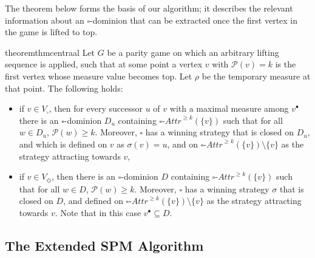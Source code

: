 \documentclass{eptcs}
\newcommand{\odd}{\ensuremath{\square}\xspace}
\newcommand{\even}{\ensuremath{\Diamond}\xspace}
\newcommand{\post}[1]{\ensuremath{#1^{\bullet}}}
\newcommand{\attrsym}{\ensuremath{\textit{Attr}}}
\newcommand{\myattr}[3]{\ensuremath{{#2}{\text{-}}\attrsym^{#1}(#3)}}
\newcommand{\priosym}{\mathcal{P}}
\newcommand{\prio}[1]{\priosym(#1)}
\begin{document}
\newcommand{\exttuples}[1]{\mathbb{M}^{#1,\textsf{ext}}}
\def\extprog{newProg}

 
\noindent
The theorem below forms the basis of our algorithm; it describes
the relevant information about an \odd-dominion that can be extracted
once the first vertex in the game is lifted to top.

\begin{restatable}{theorem}{thmcentraal}
 \label{thm:centraal}
  Let $G$ be a parity game on which an arbitrary lifting sequence is applied, such that at some point a vertex $v$ with $\prio{v}=k$ is the first vertex whose measure value becomes top. Let $\rho$ be the temporary measure at that point. The following holds:
  
  \begin{itemize}
   \item if $v \in V_{\odd}$, then for every successor $u$ of $v$ with a maximal measure among $\post{v}$ there is an \odd-dominion $D_u$ containing $\myattr{\geq k}{\odd}{\{v\}}$ such that for all $w \in D_u$, $\prio{w} \geq k$. Moreover, $\odd$ has a winning strategy that is closed on $D_u$, and which is defined on $v$ as $\sigma(v) = u$, and on $\myattr{\geq k}{\odd}{\{v\}}  \setminus \{v\}$ as the strategy attracting towards $v$,
   \item if $v \in V_{\even}$, then there is an \odd-dominion $D$ containing $\myattr{\geq k}{\odd}{\{v\}}$ such that for all $w \in D$, $\prio{w} \geq k$. Moreover,  \odd has a winning strategy $\sigma$ that is closed on $D$, and defined on $\myattr{\geq k}{\odd}{\{v\}}  \setminus \{v\}$ as the strategy attracting towards $v$.  Note that in this case $\post{v} \subseteq D$. 
   \end{itemize}     
     
 \end{restatable} 

\subsection{The Extended SPM Algorithm}

\def\res{\textsf{RES}}
\def\rem{\textsf{REM}}
\def\irr{\textsf{IRR}}
\def\dom{\textsf{DOM}}
\def\newspm{\textsf{SPM-Within}}
\end{document}
